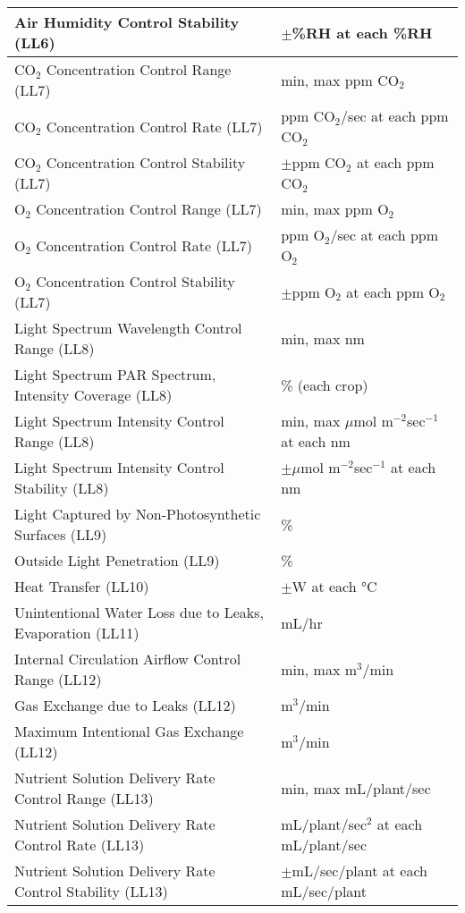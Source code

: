 \documentclass{report}
\newcounter{metricnumber}
\newcommand\rownumber{\stepcounter{metricnumber}\arabic{metricnumber}}
\begin{document}
\begin{center}
\begin{tabular}{| @{\makebox[2em][l]{\rownumber}} | l | l |}
        \hline
        Air Humidity Control Stability \hfill (LL6) & $\pm$\%RH at each \%RH \\
        \hline
        CO${}_2$ Concentration Control Range \hfill (LL7) & min, max ppm CO${}_2$ \\
        \hline
        CO${}_2$ Concentration Control Rate \hfill (LL7) & ppm CO${}_2$/sec at each ppm 
        CO${}_2$ \\
        \hline
        CO${}_2$ Concentration Control Stability \hfill (LL7) & $\pm$ppm CO${}_2$ at 
        each ppm CO${}_2$ \\
        \hline
        O${}_2$ Concentration Control Range \hfill (LL7) & min, max ppm O${}_2$ \\
        \hline
        O${}_2$ Concentration Control Rate \hfill (LL7) & ppm O${}_2$/sec at each ppm 
        O${}_2$  \\
        \hline
        O${}_2$ Concentration Control Stability \hfill (LL7) & $\pm$ppm O${}_2$ at each 
        ppm O${}_2$ \\
        \hline
        Light Spectrum Wavelength Control Range \hfill (LL8) & min, max nm \\
        \hline
        Light Spectrum PAR Spectrum, Intensity Coverage \hfill (LL8) & \% (each crop) \\
        \hline
        Light Spectrum Intensity Control Range \hfill (LL8) & min, max $\mu$mol 
        m${}^{-2}$sec${}^{-1}$ at each nm \\
        \hline
        Light Spectrum Intensity Control Stability \hfill (LL8) & $\pm\mu$mol 
        m${}^{-2}$sec${}^{-1}$ at each nm \\
        \hline
        Light Captured by Non-Photosynthetic Surfaces \hfill (LL9) & \% \\
        \hline
        Outside Light Penetration \hfill (LL9) & \% \\
        \hline
        Heat Transfer \hfill (LL10) & $\pm$W at each °C \\
        \hline
        Unintentional Water Loss due to Leaks, Evaporation \hfill (LL11) & mL/hr \\
        \hline
        Internal Circulation Airflow Control Range \hfill (LL12) & min, max m${}^3$/min \\
        \hline
        Gas Exchange due to Leaks \hfill (LL12) & m${}^3$/min \\
        \hline
        Maximum Intentional Gas Exchange \hfill (LL12) & m${}^3$/min \\
        \hline
        Nutrient Solution Delivery Rate Control Range \hfill (LL13) & min, max 
        mL/plant/sec \\
        \hline
        Nutrient Solution Delivery Rate Control Rate \hfill (LL13) & mL/plant/sec${}^2$ at each mL/plant/sec  \\
        \hline
        Nutrient Solution Delivery Rate Control Stability \hfill (LL13) & 
        $\pm$mL/sec/plant at each mL/sec/plant \\
        \hline
   \end{tabular}
\end{center}
\newpage
\end{document}
